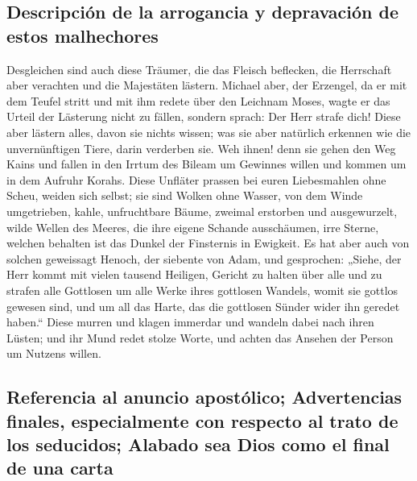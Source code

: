 \hypertarget{descripciuxf3n-de-la-arrogancia-y-depravaciuxf3n-de-estos-malhechores}{%
\subsection{Descripción de la arrogancia y depravación de estos
malhechores}\label{descripciuxf3n-de-la-arrogancia-y-depravaciuxf3n-de-estos-malhechores}}

 Desgleichen sind auch diese Träumer, die das Fleisch
beflecken, die Herrschaft aber verachten und die Majestäten lästern.
 Michael aber, der Erzengel, da er mit dem Teufel stritt
und mit ihm redete über den Leichnam Moses, wagte er das Urteil der
Lästerung nicht zu fällen, sondern sprach: Der Herr strafe dich!
 Diese aber lästern alles, davon sie nichts wissen; was
sie aber natürlich erkennen wie die unvernünftigen Tiere, darin
verderben sie.  Weh ihnen! denn sie gehen den Weg Kains
und fallen in den Irrtum des Bileam um Gewinnes willen und kommen um in
dem Aufruhr Korahs.  Diese Unfläter prassen bei euren
Liebesmahlen ohne Scheu, weiden sich selbst; sie sind Wolken ohne
Wasser, von dem Winde umgetrieben, kahle, unfruchtbare Bäume, zweimal
erstorben und ausgewurzelt,  wilde Wellen des Meeres, die
ihre eigene Schande ausschäumen, irre Sterne, welchen behalten ist das
Dunkel der Finsternis in Ewigkeit.  Es hat aber auch von
solchen geweissagt Henoch, der siebente von Adam, und gesprochen:
„Siehe, der Herr kommt mit vielen tausend Heiligen, 
Gericht zu halten über alle und zu strafen alle Gottlosen um alle Werke
ihres gottlosen Wandels, womit sie gottlos gewesen sind, und um all das
Harte, das die gottlosen Sünder wider ihn geredet haben.``
 Diese murren und klagen immerdar und wandeln dabei nach
ihren Lüsten; und ihr Mund redet stolze Worte, und achten das Ansehen
der Person um Nutzens willen.

\hypertarget{referencia-al-anuncio-apostuxf3lico-advertencias-finales-especialmente-con-respecto-al-trato-de-los-seducidos-alabado-sea-dios-como-el-final-de-una-carta}{%
\subsection{Referencia al anuncio apostólico; Advertencias finales,
especialmente con respecto al trato de los seducidos; Alabado sea Dios
como el final de una
carta}\label{referencia-al-anuncio-apostuxf3lico-advertencias-finales-especialmente-con-respecto-al-trato-de-los-seducidos-alabado-sea-dios-como-el-final-de-una-carta}}

